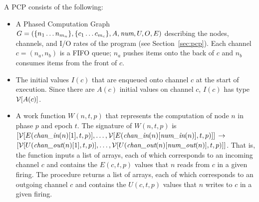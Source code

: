 A PCP consists of the following:
\begin{itemize}

\item A Phased Computation Graph $G = (\{n_1 \dots n_{m_n}\}, \{c_1
\dots c_{m_c}\}, A, \mbox{\it num}, U, O, E)$ describing the nodes,
channels, and I/O rates of the program (see Section~\ref{sec:pcp}).
Each channel $c = (n_a, n_b)$ is a FIFO queue; $n_a$ pushes items onto
the back of $c$ and $n_b$ consumes items from the front of $c$.

\item The initial values $I(c)$ that are enqueued onto channel $c$ at
the start of execution.  Since there are $A(c)$ initial values on
channel $c$, $I(c)$ has type ${\cal V}[A(c)]$.

%
\item A work function $W(n, t, p)$ that represents the computation of
node $n$ in phase $p$ and epoch $t$.  The signature of $W(n, t, p)$ is
$[{\cal V}[E(\mbox{\it chan\_in}(n)[1], t, p)], \dots, {\cal
V}[E(\mbox{\it chan\_in}(n)[\mbox{\it num\_in}(n)], t, p)]]$
${\small \rightarrow}$\\
$[ {\cal
V}[U(\mbox{\it chan\_out}(n)[1], t, p)], \dots, {\cal
V}[U(\mbox{\it chan\_out}(n)[\mbox{\it num\_out}(n)], t, p)]]$.  That is, the function
inputs a list of arrays, each of which corresponds to an incoming
channel $c$ and contains the $E(c,t,p)$ values that $n$ reads from $c$
in a given firing.  The procedure returns a list of arrays, each of
which corresponds to an outgoing channel $c$ and contains the
$U(c,t,p)$ values that $n$ writes to $c$ in a given firing.

\end{itemize}


